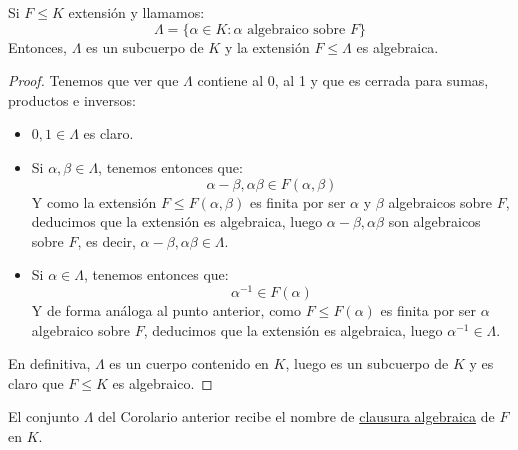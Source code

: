 \begin{coro}
    Si $F\leq K$ extensión y llamamos:
    \begin{equation*}
        \Lambda = \{\alpha\in K : \alpha \text{\ algebraico sobre\ } F\}
    \end{equation*}
    Entonces, $\Lambda$ es un subcuerpo de $K$ y la extensión $F\leq \Lambda$ es algebraica.
    \begin{proof}
        Tenemos que ver que $\Lambda$ contiene al 0, al 1 y que es cerrada para sumas, productos e inversos:
        \begin{itemize}
            \item $0,1\in \Lambda$ es claro.
            \item Si $\alpha,\beta\in \Lambda$, tenemos entonces que:
                \begin{equation*}
                    \alpha-\beta, \alpha\beta\in F(\alpha,\beta)
                \end{equation*}
                Y como la extensión $F\leq F(\alpha,\beta)$ es finita por ser $\alpha$ y $\beta$ algebraicos sobre $F$, deducimos que la extensión es algebraica, luego $\alpha-\beta,\alpha\beta$ son algebraicos sobre $F$, es decir, $\alpha-\beta,\alpha\beta\in \Lambda$.
            \item Si $\alpha\in \Lambda$, tenemos entonces que:
                \begin{equation*}
                    \alpha^{-1}\in F(\alpha)
                \end{equation*}
                Y de forma análoga al punto anterior, como $F\leq F(\alpha)$ es finita por ser $\alpha$ algebraico sobre $F$, deducimos que la extensión es algebraica, luego $\alpha^{-1}\in \Lambda$. 
        \end{itemize}
        En definitiva, $\Lambda$ es un cuerpo contenido en $K$, luego es un subcuerpo de $K$ y es claro que $F\leq K$ es algebraico.
    \end{proof}
\end{coro}

\begin{definicion}
    El conjunto $\Lambda$ del Corolario anterior recibe el nombre de \underline{clausura algebraica} de $F$ en $K$.
\end{definicion}

